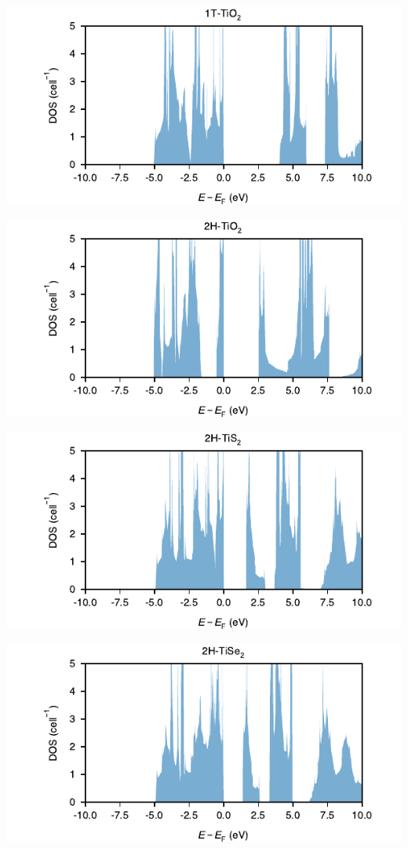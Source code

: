 \begin{center}
\includegraphics[width=.9\linewidth]{img/SI_figs/1T-TiO2-DOS.pdf}
\end{center}
\begin{center}
\includegraphics[width=.9\linewidth]{img/SI_figs/2H-TiO2-DOS.pdf}
\end{center}
\begin{center}
\includegraphics[width=.9\linewidth]{img/SI_figs/2H-TiS2-DOS.pdf}
\end{center}
\begin{center}
\includegraphics[width=.9\linewidth]{img/SI_figs/2H-TiSe2-DOS.pdf}
\end{center}

